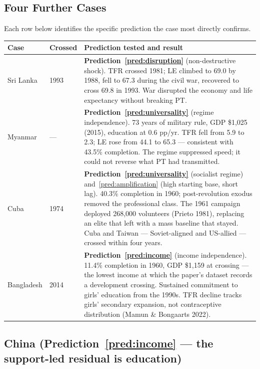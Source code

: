 \documentclass[12pt,letterpaper]{article}
\begin{document}
\subsection{Four Further Cases}\label{four-further-cases}

Each row below identifies the specific prediction the case most
directly confirms.

\begin{longtable}[]{@{}llp{}@{}}
\toprule
Case & Crossed & Prediction tested and result \\
\midrule
\endhead
Sri Lanka\label{sri-lanka} & 1993 & \textbf{Prediction~\ref{pred:disruption}} (non-destructive shock). TFR crossed 1981; LE climbed to 69.0 by 1988, fell to 67.3 during the civil war, recovered to cross 69.8 in 1993. War disrupted the economy and life expectancy without breaking PT. \\
Myanmar\label{myanmar} & --- & \textbf{Prediction~\ref{pred:universality}} (regime independence). 73 years of military rule, GDP \$1,025 (2015), education at 0.6 pp/yr. TFR fell from 5.9 to 2.3; LE rose from 44.1 to 65.3 --- consistent with 43.5\% completion. The regime suppressed speed; it could not reverse what PT had transmitted. \\
Cuba\label{cuba} & 1974 & \textbf{Prediction~\ref{pred:universality}} (socialist regime) and~\ref{pred:amplification} (high starting base, short lag). 40.3\% completion in 1960; post-revolution exodus removed the professional class. The 1961 campaign deployed 268,000 volunteers (Prieto 1981), replacing an elite that left with a mass baseline that stayed. Cuba and Taiwan --- Soviet-aligned and US-allied --- crossed within four years. \\
Bangladesh\label{bangladesh} & 2014 & \textbf{Prediction~\ref{pred:income}} (income independence). 11.4\% completion in 1960, GDP \$1,159 at crossing --- the lowest income at which the paper's dataset records a development crossing. Sustained commitment to girls' education from the 1990s. TFR decline tracks girls' secondary expansion, not contraceptive distribution (Mamun \& Bongaarts 2022). \\
\bottomrule
\end{longtable}

\subsection{China (Prediction~\ref{pred:income} --- the support-led residual is education)}\label{china}
\end{document}
